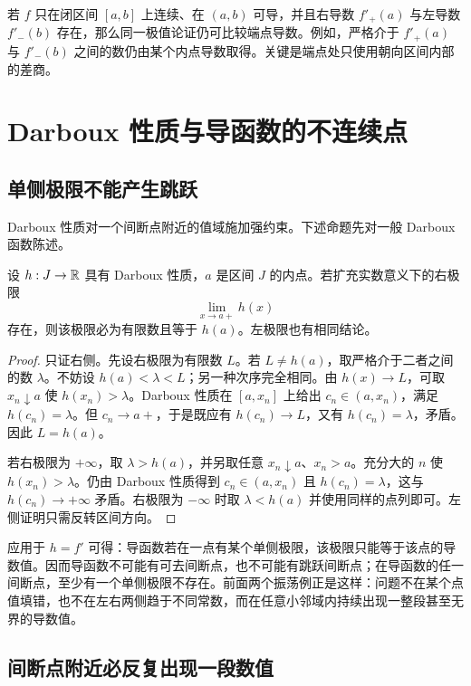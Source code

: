 若 \(f\) 只在闭区间 \([a,b]\) 上连续、在 \((a,b)\) 可导，并且右导数 \(f'_+(a)\) 与左导数 \(f'_-(b)\) 存在，那么同一极值论证仍可比较端点导数。例如，严格介于 \(f'_+(a)\) 与 \(f'_-(b)\) 之间的数仍由某个内点导数取得。关键是端点处只使用朝向区间内部的差商。

\section{Darboux 性质与导函数的不连续点}

\subsection{单侧极限不能产生跳跃}

Darboux 性质对一个间断点附近的值域施加强约束。下述命题先对一般 Darboux 函数陈述。

\begin{proposition}
\label{prop:darboux-one-sided-limit}
设 \(h:J\to\mathbb{R}\) 具有 Darboux 性质，\(a\) 是区间 \(J\) 的内点。若扩充实数意义下的右极限
\[
 \lim_{x\to a+}h(x)
\]
存在，则该极限必为有限数且等于 \(h(a)\)。左极限也有相同结论。
\end{proposition}

\begin{proof}
只证右侧。先设右极限为有限数 \(L\)。若 \(L\ne h(a)\)，取严格介于二者之间的数 \(\lambda\)。不妨设 \(h(a)<\lambda<L\)；另一种次序完全相同。由 \(h(x)\to L\)，可取 \(x_n\downarrow a\) 使 \(h(x_n)>\lambda\)。Darboux 性质在 \([a,x_n]\) 上给出 \(c_n\in(a,x_n)\)，满足 \(h(c_n)=\lambda\)。但 \(c_n\to a+\)，于是既应有 \(h(c_n)\to L\)，又有 \(h(c_n)=\lambda\)，矛盾。因此 \(L=h(a)\)。

若右极限为 \(+\infty\)，取 \(\lambda>h(a)\)，并另取任意 \(x_n\downarrow a\)、\(x_n>a\)。充分大的 \(n\) 使 \(h(x_n)>\lambda\)。仍由 Darboux 性质得到 \(c_n\in(a,x_n)\) 且 \(h(c_n)=\lambda\)，这与 \(h(c_n)\to+\infty\) 矛盾。右极限为 \(-\infty\) 时取 \(\lambda<h(a)\) 并使用同样的点列即可。左侧证明只需反转区间方向。
\end{proof}

应用于 \(h=f'\) 可得：导函数若在一点有某个单侧极限，该极限只能等于该点的导数值。因而导函数不可能有可去间断点，也不可能有跳跃间断点；在导函数的任一间断点，至少有一个单侧极限不存在。前面两个振荡例正是这样：问题不在某个点值填错，也不在左右两侧趋于不同常数，而在任意小邻域内持续出现一整段甚至无界的导数值。

\subsection{间断点附近必反复出现一段数值}

